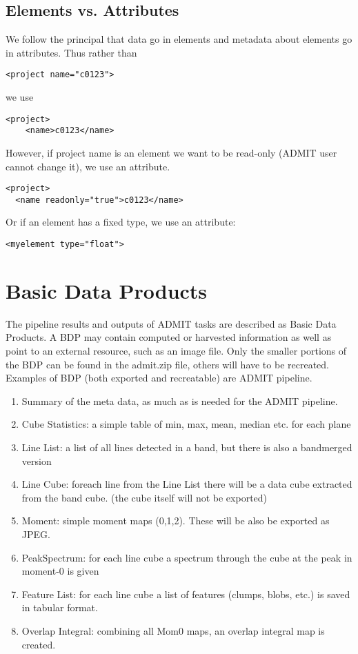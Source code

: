 \documentclass{article}
\begin{document}
\subsection{Elements vs. Attributes}
We follow the principal that data go in elements and metadata about
elements go in attributes.   Thus rather than

\begin{verbatim}
<project name="c0123">  
\end{verbatim}

\noindent we use 

\begin{verbatim}
<project>
    <name>c0123</name>
\end{verbatim}

\noindent However, if project name is an element we want to
be read-only (ADMIT user cannot change it), we use an attribute.

\begin{verbatim}
<project>
  <name readonly="true">c0123</name>
\end{verbatim}

\noindent Or if an element has a fixed type, we use an attribute:
\begin{verbatim}
<myelement type="float">
\end{verbatim}

\section{Basic Data Products}

The pipeline results and outputs of ADMIT tasks are described as 
Basic Data Products. A BDP may contain computed or harvested information
as well as point to an external resource, such as an image file.
Only the smaller portions of the BDP can be found
in the admit.zip file, others will have to be recreated. 
%
Examples of BDP (both exported and recreatable) are
ADMIT pipeline. 

\begin{enumerate}
\item
Summary of the meta data, as much as is needed for the ADMIT pipeline.
\item
Cube Statistics: a simple table of min, max, mean, median etc. for each plane
\item
Line List: a list of all lines detected in a band, but there is also a bandmerged version
\item
Line Cube: foreach line from the Line List there will be a data cube extracted from the
band cube.  (the cube itself will not be exported)
\item
Moment: simple moment maps (0,1,2). These will be also be exported as JPEG.
\item
PeakSpectrum: for each line cube a spectrum through the cube at the peak in moment-0 is given
\item
Feature List: for each line cube a list of features (clumps, blobs, etc.) is saved in tabular format.
\item 
Overlap Integral: combining all Mom0 maps, an overlap integral map is created.
\end{enumerate}
\end{document}
